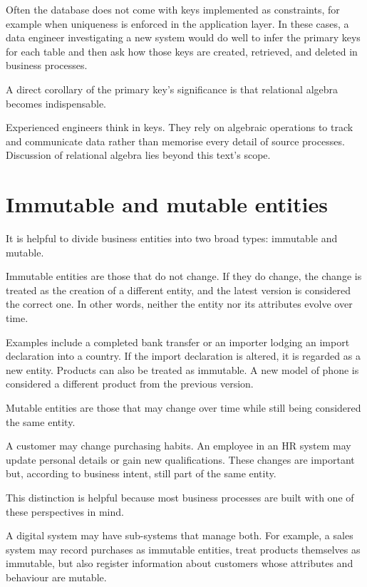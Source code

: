 \documentclass[10pt,openany,10pt]{book}
\begin{document}
Often the database does not come with keys implemented as constraints,
for example when uniqueness is enforced in the application layer. In
these cases, a data engineer investigating a new system would do well to
infer the primary keys for each table and then ask how those keys are
created, retrieved, and deleted in business processes.

A direct corollary of the primary key's significance is that relational
algebra becomes indispensable.

Experienced engineers think in keys. They rely on algebraic operations
to track and communicate data rather than memorise every detail of
source processes. Discussion of relational algebra lies beyond this
text's scope.

\section{Immutable and mutable
entities}\label{immutable-and-mutable-entities}

It is helpful to divide business entities into two broad types:
immutable and mutable.

Immutable entities are those that do not change. If they do change, the
change is treated as the creation of a different entity, and the latest
version is considered the correct one. In other words, neither the
entity nor its attributes evolve over time.

Examples include a completed bank transfer or an importer lodging an
import declaration into a country. If the import declaration is altered,
it is regarded as a new entity. Products can also be treated as
immutable. A new model of phone is considered a different product from
the previous version.

Mutable entities are those that may change over time while still being
considered the same entity.

A customer may change purchasing habits. An employee in an HR system may
update personal details or gain new qualifications. These changes are
important but, according to business intent, still part of the same
entity.

This distinction is helpful because most business processes are built
with one of these perspectives in mind.

A digital system may have sub-systems that manage both. For example, a
sales system may record purchases as immutable entities, treat products
themselves as immutable, but also register information about customers
whose attributes and behaviour are mutable.
\end{document}
